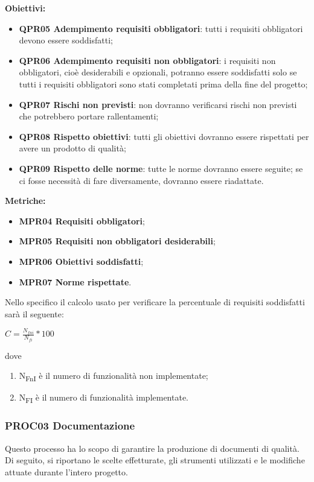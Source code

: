 \documentclass[../piano_di_qualifica.tex]{subfiles}
\begin{document}
\textbf{Obiettivi:}
\smallbreak
\begin{itemize}
	\item \textbf{QPR05 Adempimento requisiti obbligatori}: tutti i requisiti obbligatori devono essere soddisfatti;
	\item \textbf{QPR06 Adempimento requisiti non obbligatori}: i requisiti non obbligatori, cioè desiderabili e opzionali, potranno essere soddisfatti solo se tutti i requisiti obbligatori sono stati completati prima della fine del progetto;
	\item \textbf{QPR07 Rischi non previsti}: non dovranno verificarsi rischi non previsti che potrebbero portare rallentamenti;
	\item \textbf{QPR08 Rispetto obiettivi}: tutti gli obiettivi dovranno essere rispettati per avere un prodotto di qualità;
	\item \textbf{QPR09 Rispetto delle norme}: tutte le norme dovranno essere seguite; se ci fosse necessità di fare diversamente, dovranno essere riadattate.
\end{itemize}

\textbf{Metriche:}
\smallbreak
\begin{itemize}
	\item \textbf{MPR04 Requisiti obbligatori};
	\item \textbf{MPR05 Requisiti non obbligatori desiderabili};
	\item \textbf{MPR06 Obiettivi soddisfatti};
	\item \textbf{MPR07 Norme rispettate}.
\end{itemize}

Nello specifico il calcolo usato per verificare la percentuale di requisiti soddisfatti sarà il seguente: \par
\begin{center}
	$C = \frac{N_{fni}}{N_{fi}} * 100$
\end{center}

dove
\begin{enumerate}
	\item N\textsubscript{FnI} è il numero di funzionalità non implementate;
	\item N\textsubscript{FI} è il numero di funzionalità implementate.
\end{enumerate}

\subsubsection{PROC03 Documentazione}
Questo processo ha lo scopo di garantire la produzione di documenti di qualità. Di seguito, si riportano le scelte effetturate, gli strumenti utilizzati e le modifiche attuate durante l'intero progetto.\\
\end{document}
